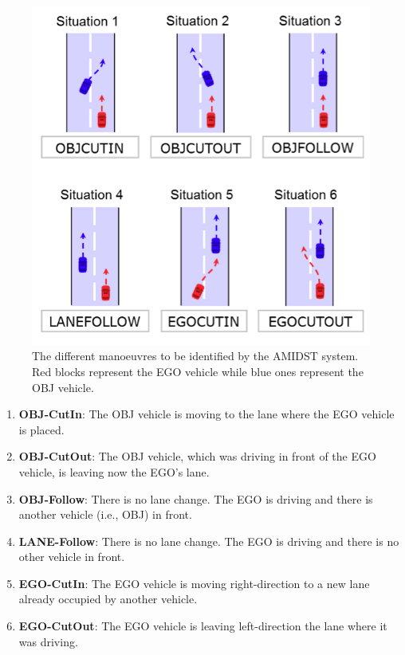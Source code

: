 \begin{figure}[ht!]
\begin{center}
\includegraphics[scale=0.4]{./figures/DaimlerManeuvers}
\caption{\label{Figure:DaimlerManeuvers}The different manoeuvres to be identified by the AMIDST system. Red blocks represent the EGO vehicle while blue ones represent the OBJ vehicle.}
\end{center}
\end{figure}

\begin{enumerate}
\item \textbf{OBJ-CutIn}: The OBJ vehicle is moving to the lane where the EGO vehicle is placed.
\item \textbf{OBJ-CutOut}: The OBJ vehicle, which was driving in front of the EGO vehicle, is leaving now the EGO's lane.
\item \textbf{OBJ-Follow}: There is no lane change. The EGO is driving and there is another vehicle (i.e., OBJ) in front.
\item \textbf{LANE-Follow}: There is no lane change. The EGO is driving and there is no other vehicle in front.
\item \textbf{EGO-CutIn}: The EGO vehicle is moving right-direction to a new lane already occupied by another vehicle. 
\item \textbf{EGO-CutOut}: The EGO vehicle is leaving left-direction the lane where it was driving.
\end{enumerate}

